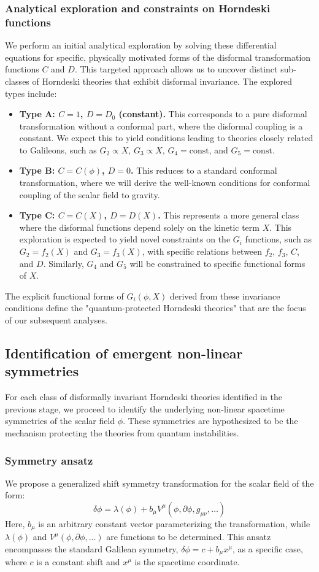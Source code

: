 \documentclass[twocolumn]{aastex631}
\begin{document}
\subsubsection{Analytical exploration and constraints on Horndeski functions}
We perform an initial analytical exploration by solving these differential equations for specific, physically motivated forms of the disformal transformation functions $C$ and $D$. This targeted approach allows us to uncover distinct sub-classes of Horndeski theories that exhibit disformal invariance. The explored types include:
\begin{itemize}
    \item \textbf{Type A: $C=1$, $D=D_0$ (constant).} This corresponds to a pure disformal transformation without a conformal part, where the disformal coupling is a constant. We expect this to yield conditions leading to theories closely related to Galileons, such as $G_2 \propto X$, $G_3 \propto X$, $G_4 = \text{const}$, and $G_5 = \text{const}$.
    \item \textbf{Type B: $C=C(\phi)$, $D=0$.} This reduces to a standard conformal transformation, where we will derive the well-known conditions for conformal coupling of the scalar field to gravity.
    \item \textbf{Type C: $C=C(X)$, $D=D(X)$.} This represents a more general class where the disformal functions depend solely on the kinetic term $X$. This exploration is expected to yield novel constraints on the $G_i$ functions, such as $G_2 = f_2(X)$ and $G_3 = f_3(X)$, with specific relations between $f_2$, $f_3$, $C$, and $D$. Similarly, $G_4$ and $G_5$ will be constrained to specific functional forms of $X$.
\end{itemize}
The explicit functional forms of $G_i(\phi, X)$ derived from these invariance conditions define the "quantum-protected Horndeski theories" that are the focus of our subsequent analyses.

\subsection{Identification of emergent non-linear symmetries}
For each class of disformally invariant Horndeski theories identified in the previous stage, we proceed to identify the underlying non-linear spacetime symmetries of the scalar field $\phi$. These symmetries are hypothesized to be the mechanism protecting the theories from quantum instabilities.

\subsubsection{Symmetry ansatz}
We propose a generalized shift symmetry transformation for the scalar field of the form:
$$ \delta \phi = \lambda(\phi) + b_\mu V^\mu(\phi, \partial\phi, g_{\mu\nu}, \dots) $$
Here, $b_\mu$ is an arbitrary constant vector parameterizing the transformation, while $\lambda(\phi)$ and $V^\mu(\phi, \partial\phi, \dots)$ are functions to be determined. This ansatz encompasses the standard Galilean symmetry, $\delta\phi = c + b_\mu x^\mu$, as a specific case, where $c$ is a constant shift and $x^\mu$ is the spacetime coordinate.
\end{document}
